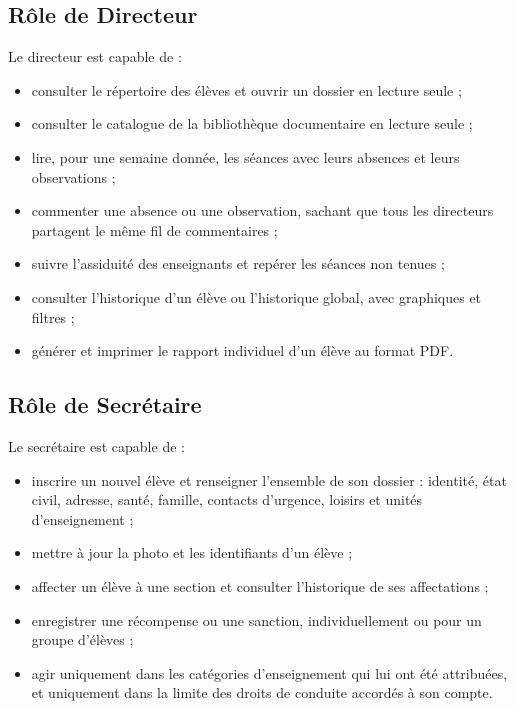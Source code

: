 \subsection{Rôle de Directeur}
Le directeur est capable de :
\begin{itemize}
    \item consulter le répertoire des élèves et ouvrir un dossier en lecture seule ;
    \item consulter le catalogue de la bibliothèque documentaire en lecture seule ;
    \item lire, pour une semaine donnée, les séances avec leurs absences et leurs observations ;
    \item commenter une absence ou une observation, sachant que tous les directeurs partagent le même
          fil de commentaires ;
    \item suivre l'assiduité des enseignants et repérer les séances non tenues ;
    \item consulter l'historique d'un élève ou l'historique global, avec graphiques et filtres ;
    \item générer et imprimer le rapport individuel d'un élève au format \ac{PDF}.
\end{itemize}

\subsection{Rôle de Secrétaire}
Le secrétaire est capable de :
\begin{itemize}
    \item inscrire un nouvel élève et renseigner l'ensemble de son dossier : identité, état civil,
          adresse, santé, famille, contacts d'urgence, loisirs et unités d'enseignement ;
    \item mettre à jour la photo et les identifiants d'un élève ;
    \item affecter un élève à une section et consulter l'historique de ses affectations ;
    \item enregistrer une récompense ou une sanction, individuellement ou pour un groupe d'élèves ;
    \item agir uniquement dans les catégories d'enseignement qui lui ont été attribuées, et uniquement
          dans la limite des droits de conduite accordés à son compte.
\end{itemize}

